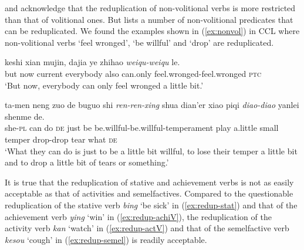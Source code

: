 \citet[53]{Chen2001} and \citet[10--11]{Yang2003} acknowledge that the reduplication of non\hyp{}vo\-li\-tion\-al verbs is more restricted than that of volitional ones.
But \citet[381--382]{Zhu1998} lists a number of non\hyp{}volitional predicates that can be reduplicated.
We found the examples shown in (\ref{ex:nonvol}) in {CCL} where non\nobreakdash-vo\-li\-tion\-al verbs  `feel wronged',  `be willful' and  `drop' are reduplicated.

\settowidth{}

\begin{sloppypar}
\ea\label{ex:nonvol}
\ea
\gll keshi xian mujin, dajia ye zhihao \textit{weiqu-weiqu} le.\\
but now current everybody also can.only feel.wronged-feel.wronged \textsc{ptc}\\ 
\glt `But now, everybody can only feel wronged a little bit.'

\ex
\gll ta-men neng zuo de buguo shi \textit{ren-ren-xing} shua dian'er xiao piqi \textit{diao-diao} yanlei shenme de.\\
she-\textsc{pl} can do \textsc{de} just be be.willful-be.willful-temperament play a.little small temper drop-drop tear what \textsc{de}\\ 
\glt `What they can do is just to be a little bit willful, to lose their temper a little bit and to drop a little bit of tears or something.'
\z
\z
\end{sloppypar}

It is true that  the reduplication of stative and achievement verbs is not as easily acceptable as that of activities and semelfactives.
Compared to the questionable reduplication of the stative verb \textit{bing} `be sick' in (\ref{ex:redup-stat})
and that of the achievement verb \textit{ying} `win' in (\ref{ex:redup-achiV}), 
the reduplication of the activity verb \textit{kan} `watch' in (\ref{ex:redup-actV})
and that of the semelfactive verb \textit{kesou} `cough' in (\ref{ex:redup-semel}) is readily acceptable.

\settowidth{}

\ea
{}\label{ex:redup-stat}


